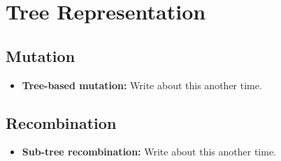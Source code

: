 \documentclass{article}
\begin{document}
   \section{Tree Representation}
   \subsection{Mutation}
   \begin{itemize}
   \item \textbf{Tree-based mutation:} Write about this another time.
   \end{itemize}
   \subsection{Recombination}
   \begin{itemize}
   \item \textbf{Sub-tree recombination:} Write about this another time.
   \end{itemize}
\end{document}
